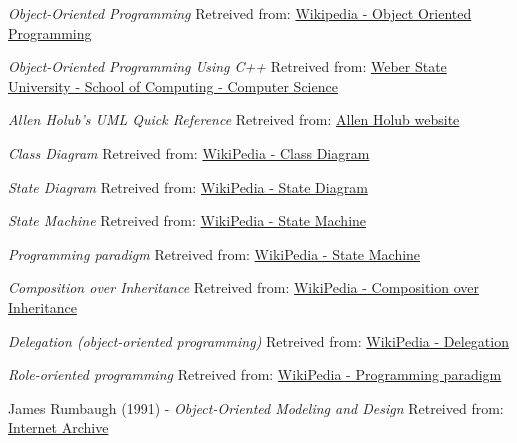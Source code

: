      \emph{Object-Oriented Programming}
    \newline
    Retreived from: \href{https://en.wikipedia.org/wiki/Object-oriented_programming}{Wikipedia - Object Oriented Programming}

     \emph{Object-Oriented Programming Using C++}
    \newline
    Retreived from: \href{https://icarus.cs.weber.edu/~dab/cs1410/textbook/}{Weber State University - School of Computing - Computer Science}

     \emph{Allen Holub's UML Quick Reference}
    \newline
    Retreived from: \href{https://holub.com/uml/}{Allen Holub website}

     \emph{Class Diagram}
    \newline
    Retreived from: \href{https://en.wikipedia.org/wiki/Class_diagram}{WikiPedia - Class Diagram}
    
     \emph{State Diagram}
    \newline
    Retreived from: \href{https://en.wikipedia.org/wiki/State_diagram}{WikiPedia - State Diagram}
    
     \emph{State Machine}
    \newline
    Retreived from: \href{https://en.wikipedia.org/wiki/Class_diagram}{WikiPedia - State Machine}

     \emph{Programming paradigm}
    \newline
    Retreived from: \href{https://en.wikipedia.org/wiki/Programming_paradigm}{WikiPedia - State Machine}
    
     \emph{Composition over Inheritance}
    \newline
    Retreived from: \href{https://en.wikipedia.org/wiki/Composition_over_inheritance}{WikiPedia - Composition over Inheritance}
    
     \emph{Delegation (object-oriented programming)}
    \newline
    Retreived from: \href{https://en.wikipedia.org/wiki/Delegation_(object-oriented_programming)}{WikiPedia - Delegation}
    
     \emph{Role-oriented programming}
    \newline
    Retreived from: \href{https://en.wikipedia.org/wiki/Programming_paradigm}{WikiPedia - Programming paradigm}
    
    James Rumbaugh (1991) - \emph{Object-Oriented Modeling and Design}
    \newline
    Retreived from: \href{https://archive.org/details/objectorientedmo00rumb}{Internet Archive}

